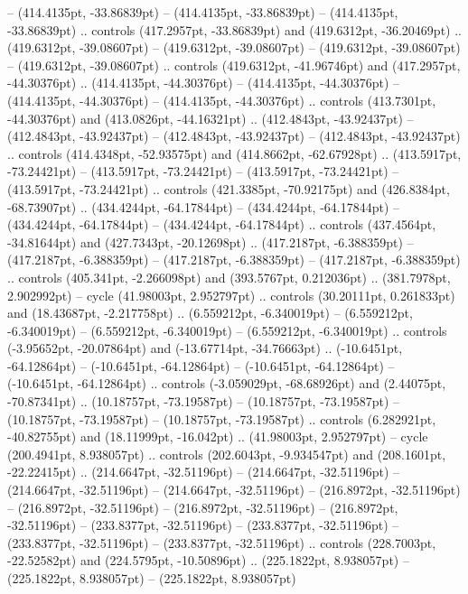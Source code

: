  -- (414.4135pt, -33.86839pt)
 -- (414.4135pt, -33.86839pt)
 -- (414.4135pt, -33.86839pt) .. controls (417.2957pt, -33.86839pt) and (419.6312pt, -36.20469pt) .. (419.6312pt, -39.08607pt)
 -- (419.6312pt, -39.08607pt)
 -- (419.6312pt, -39.08607pt)
 -- (419.6312pt, -39.08607pt) .. controls (419.6312pt, -41.96746pt) and (417.2957pt, -44.30376pt) .. (414.4135pt, -44.30376pt)
 -- (414.4135pt, -44.30376pt)
 -- (414.4135pt, -44.30376pt)
 -- (414.4135pt, -44.30376pt) .. controls (413.7301pt, -44.30376pt) and (413.0826pt, -44.16321pt) .. (412.4843pt, -43.92437pt)
 -- (412.4843pt, -43.92437pt)
 -- (412.4843pt, -43.92437pt)
 -- (412.4843pt, -43.92437pt) .. controls (414.4348pt, -52.93575pt) and (414.8662pt, -62.67928pt) .. (413.5917pt, -73.24421pt)
 -- (413.5917pt, -73.24421pt)
 -- (413.5917pt, -73.24421pt)
 -- (413.5917pt, -73.24421pt) .. controls (421.3385pt, -70.92175pt) and (426.8384pt, -68.73907pt) .. (434.4244pt, -64.17844pt)
 -- (434.4244pt, -64.17844pt)
 -- (434.4244pt, -64.17844pt)
 -- (434.4244pt, -64.17844pt) .. controls (437.4564pt, -34.81644pt) and (427.7343pt, -20.12698pt) .. (417.2187pt, -6.388359pt)
 -- (417.2187pt, -6.388359pt)
 -- (417.2187pt, -6.388359pt)
 -- (417.2187pt, -6.388359pt) .. controls (405.341pt, -2.266098pt) and (393.5767pt, 0.212036pt) .. (381.7978pt, 2.902992pt) -- cycle
(41.98003pt, 2.952797pt) .. controls (30.20111pt, 0.261833pt) and (18.43687pt, -2.217758pt) .. (6.559212pt, -6.340019pt)
 -- (6.559212pt, -6.340019pt)
 -- (6.559212pt, -6.340019pt)
 -- (6.559212pt, -6.340019pt) .. controls (-3.95652pt, -20.07864pt) and (-13.67714pt, -34.76663pt) .. (-10.6451pt, -64.12864pt)
 -- (-10.6451pt, -64.12864pt)
 -- (-10.6451pt, -64.12864pt)
 -- (-10.6451pt, -64.12864pt) .. controls (-3.059029pt, -68.68926pt) and (2.44075pt, -70.87341pt) .. (10.18757pt, -73.19587pt)
 -- (10.18757pt, -73.19587pt)
 -- (10.18757pt, -73.19587pt)
 -- (10.18757pt, -73.19587pt) .. controls (6.282921pt, -40.82755pt) and (18.11999pt, -16.042pt) .. (41.98003pt, 2.952797pt) -- cycle
(200.4941pt, 8.938057pt) .. controls (202.6043pt, -9.934547pt) and (208.1601pt, -22.22415pt) .. (214.6647pt, -32.51196pt)
 -- (214.6647pt, -32.51196pt)
 -- (214.6647pt, -32.51196pt)
 -- (214.6647pt, -32.51196pt)
 -- (216.8972pt, -32.51196pt)
 -- (216.8972pt, -32.51196pt)
 -- (216.8972pt, -32.51196pt)
 -- (216.8972pt, -32.51196pt)
 -- (233.8377pt, -32.51196pt)
 -- (233.8377pt, -32.51196pt)
 -- (233.8377pt, -32.51196pt)
 -- (233.8377pt, -32.51196pt) .. controls (228.7003pt, -22.52582pt) and (224.5795pt, -10.50896pt) .. (225.1822pt, 8.938057pt)
 -- (225.1822pt, 8.938057pt)
 -- (225.1822pt, 8.938057pt)
